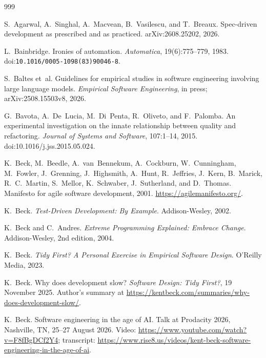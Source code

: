 \documentclass[11pt,a4paper]{article}
\begin{document}
\begingroup
\small
\begin{thebibliography}{999}

S.~Agarwal, A.~Singhal, A.~Macvean, B.~Vasilescu, and T.~Breaux.
\newblock Spec-driven development as prescribed and as practiced.
\newblock arXiv:2608.25202, 2026.

L.~Bainbridge.
\newblock Ironies of automation.
\newblock \emph{Automatica}, 19(6):775--779, 1983.
\newblock doi:\nolinkurl{10.1016/0005-1098(83)90046-8}.

S.~Baltes et~al.
\newblock Guidelines for empirical studies in software engineering involving
large language models.
\newblock \emph{Empirical Software Engineering}, in press;
arXiv:2508.15503v8, 2026.

G.~Bavota, A.~De~Lucia, M.~Di~Penta, R.~Oliveto, and F.~Palomba.
\newblock An experimental investigation on the innate relationship between
quality and refactoring.
\newblock \emph{Journal of Systems and Software}, 107:1--14, 2015.
\newblock doi:10.1016/j.jss.2015.05.024.

K.~Beck, M.~Beedle, A.~van~Bennekum, A.~Cockburn, W.~Cunningham, M.~Fowler,
J.~Grenning, J.~Highsmith, A.~Hunt, R.~Jeffries, J.~Kern, B.~Marick,
R.~C.~Martin, S.~Mellor, K.~Schwaber, J.~Sutherland, and D.~Thomas.
\newblock Manifesto for agile software development, 2001.
\newblock \url{https://agilemanifesto.org/}.

K.~Beck.
\newblock \emph{Test-Driven Development: By Example}.
\newblock Addison-Wesley, 2002.

K.~Beck and C.~Andres.
\newblock \emph{Extreme Programming Explained: Embrace Change}.
\newblock Addison-Wesley, 2nd edition, 2004.

K.~Beck.
\newblock \emph{Tidy First? A Personal Exercise in Empirical Software Design}.
\newblock O'Reilly Media, 2023.

K.~Beck.
\newblock Why does development slow?
\newblock \emph{Software Design: Tidy First?}, 19 November 2025. Author's
summary at \url{https://kentbeck.com/summaries/why-does-development-slow/}.

K.~Beck.
\newblock Software engineering in the age of {AI}.
\newblock Talk at Prodacity 2026, Nashville, TN, 25--27 August 2026.
\newblock Video: \url{https://www.youtube.com/watch?v=F8fBgDCf2Y4}; transcript:
\url{https://www.rise8.us/videos/kent-beck-software-engineering-in-the-age-of-ai}.


\end{thebibliography}
\end{document}
